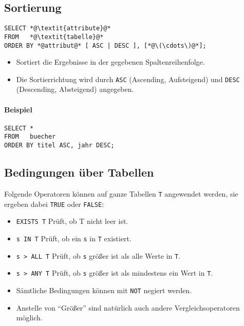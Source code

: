 		\subsection{Sortierung} %
			\begin{lstlisting}
SELECT *@\textit{attribute}@*
FROM   *@\textit{tabelle}@*
ORDER BY *@attribut@* [ ASC | DESC ], [*@\(\cdots\)@*];
        	\end{lstlisting}

			\begin{itemize}
				\item Sortiert die Ergebnisse in der gegebenen Spaltenreihenfolge.
				\item Die Sortierrichtung wird durch \lstinline|ASC| (Ascending, Aufsteigend) und \lstinline|DESC| (Descending, Absteigend) angegeben.
			\end{itemize}

			\paragraph{Beispiel}
				\begin{lstlisting}
SELECT *
FROM   buecher
ORDER BY titel ASC, jahr DESC;
            	\end{lstlisting}

		\subsection{Bedingungen über Tabellen} %
			Folgende Operatoren können auf ganze Tabellen \texttt{T} angewendet werden, sie ergeben dabei \lstinline|TRUE| oder \lstinline|FALSE|:
			\begin{itemize}
				\item \lstinline|EXISTS T|  \tabto{2.5cm} Prüft, ob T nicht leer ist.
				\item \lstinline|s IN T|    \tabto{2.5cm} Prüft, ob ein \texttt{s} in \texttt{T} existiert.
				\item \lstinline|s > ALL T| \tabto{2.5cm} Prüft, ob \texttt{s} größer ist als alle Werte in \texttt{T}.
				\item \lstinline|s > ANY T| \tabto{2.5cm} Prüft, ob \texttt{s} größer ist als mindestens ein Wert in \texttt{T}.
				\item Sämtliche Bedingungen können mit \lstinline|NOT| negiert werden.
				\item Anstelle von \enquote{Größer} sind natürlich auch andere Vergleichsoperatoren möglich.
			\end{itemize}

